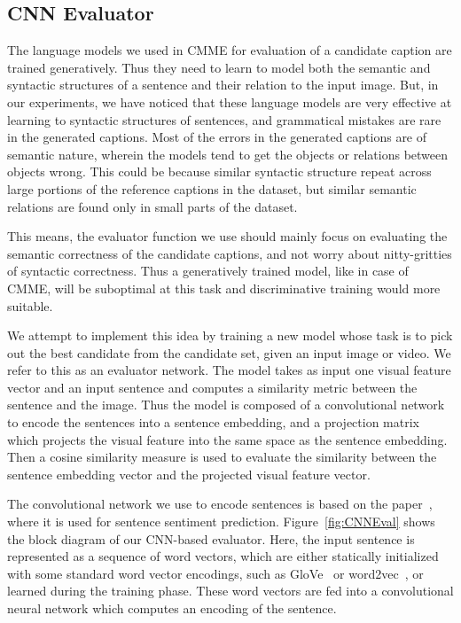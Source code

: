 \subsection{CNN Evaluator}
The language models we used in CMME for evaluation of a candidate caption are
trained generatively.
Thus they need to learn to model both the semantic and syntactic structures of a
sentence and their relation to the input image.
But, in our experiments, we have noticed that these language models are very
effective at learning to syntactic structures of sentences, and grammatical
mistakes are rare in the generated captions.
Most of the errors in the generated captions are of semantic nature, wherein the
models tend to get the objects or relations between objects wrong.
This could be because similar syntactic structure repeat across large portions
of the reference captions in the dataset, but similar semantic relations are
found only in small parts of the dataset.

This means, the evaluator function we use should mainly focus on evaluating the
semantic correctness of the candidate captions, and not worry about
nitty-gritties of syntactic correctness. 
Thus a generatively trained model, like in case of CMME, will be suboptimal at
this task and discriminative training would more suitable. 

We attempt to implement this idea by training a new model whose task
is to pick out the best candidate from the candidate set, given an
input image or video.
We refer to this as an evaluator network.
The model takes as input one visual feature vector and an input sentence and
computes a similarity metric between the sentence and the image. 
Thus the model is composed of a convolutional network to encode the sentences
into a sentence embedding, and a projection matrix which projects the visual
feature into the same space as the sentence embedding.
Then a cosine similarity measure is used to evaluate the similarity between the
sentence embedding vector and the projected visual feature vector. 

The convolutional network we use to encode sentences is based on the
paper~\cite{kim:2014:CNNsent}, where it is used for sentence sentiment
prediction.
Figure~\ref{fig:CNNEval} shows the block diagram of our CNN-based evaluator.  
Here, the input sentence is represented as a sequence of word vectors, which are
either statically initialized with some standard word vector encodings, such as
GloVe~\cite{pennington2014glove} or word2vec~\cite{mikolov2013distributed}, or
learned during the training phase.
These word vectors are fed into a convolutional neural network which computes an
encoding of the sentence.

